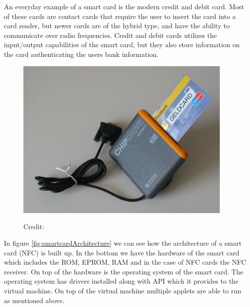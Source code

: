 An everyday example of a smart card is the modern credit and debit card. Most of these cards are contact cards that require the user to insert the card into a card reader, but newer cards are of the hybrid type, and have the ability to communicate over radio frequencies. Credit and debit cards utilizes the input/output capabilities of the smart card, but they also store information on the card authenticating the users bank information.

\begin{figure}[h!]

  \centering
  \includegraphics[width=0.95\textwidth]{images/chipdrive.jpg}
  \begin{flushright}
  \hspace*{15pt}\hbox{\scriptsize Credit:}
\end{flushright}
  \label{fig:nfccard}
\end{figure}

In figure \ref{fig:smartcardArchitecture} we can see how the architecture of a smart card (NFC) is built up. In the bottom we have the hardware of the smart card which includes the ROM, EPROM, RAM and in the case of NFC cards the NFC receiver. On top of the hardware is the operating system of the smart card. The operating system has drivers installed along with API which it provides to the virtual machine. On top of the virtual machine multiple applets are able to run as mentioned above.

